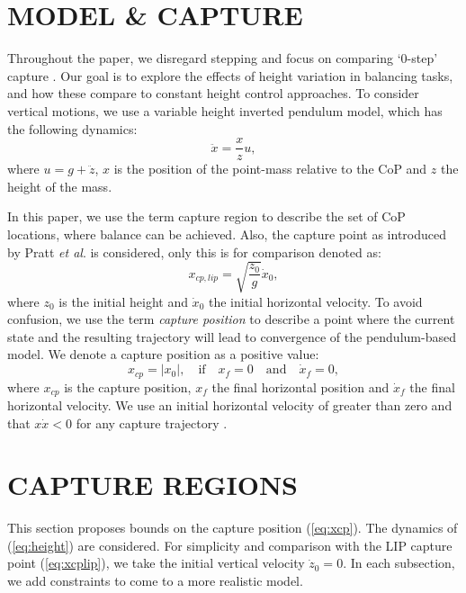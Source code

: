 \documentclass[letterpaper, 10 pt, conference]{ieeeconf}  %
\begin{document}
\section{MODEL \& CAPTURE}\label{sec:models}
Throughout the paper, we disregard stepping and focus on comparing `0-step' capture \cite{koolen2012capturability}. Our goal is to explore the effects of height variation in balancing tasks, and how these compare to constant height control approaches. To consider vertical motions, we use a variable height inverted pendulum model, which has the following dynamics:
\begin{equation}
	\ddot{x} = \frac{x}{z}u,
	\label{eq:height}
\end{equation}
where $u=g+\ddot{z}$, $x$ is the position of the point-mass relative to the CoP and $z$ the height of the mass.

In this paper, we use the term capture region \cite{pratt2006capture} to describe the set of CoP locations, where balance can be achieved. Also, the capture point as introduced by Pratt \textit{et al}. is considered, only this is for comparison denoted as:
\begin{equation}
	x_{cp,lip} = \sqrt{\frac{z_0}{g}}\dot{x}_0,
	\label{eq:xcplip}
\end{equation}
where $z_0$ is the initial height and $\dot{x}_0$ the initial horizontal velocity. To avoid confusion, we use the term \textit{capture position} to describe a point where the current state and the resulting trajectory will lead to convergence of the pendulum-based model. We denote a capture position as a positive value:
\begin{equation}
	x_{cp}= |x_0|,\quad \text{if} \quad x_f=0 \quad \text{and} \quad \dot{x}_f=0,
	\label{eq:xcp}
\end{equation}
where $x_{cp}$ is the capture position, $x_f$ the final horizontal position and $\dot{x}_f$ the final horizontal velocity. We use an initial horizontal velocity of greater than zero and that $x\dot{x} < 0$ for any capture trajectory \cite{koolen2016balance}.

\section{CAPTURE REGIONS}\label{sec:regions}
This section proposes bounds on the capture position (\ref{eq:xcp}). The dynamics of (\ref{eq:height}) are considered. For simplicity and comparison with the LIP capture point (\ref{eq:xcplip}), we take the initial vertical velocity $\dot{z}_0=0$. In each subsection, we add constraints to come to a more realistic model. 
\end{document}
